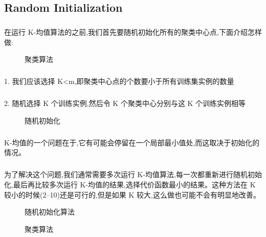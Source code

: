 \documentclass{article}
\begin{document}
\begin{CJK}{UTF8}{gbsn}
\subsection{Random Initialization}
\subparagraph{}
在运行 K-均值算法的之前,我们首先要随机初始化所有的聚类中心点,下面介绍怎样做:
\begin{figure}[H]
\label{fig:816}
\caption{聚类算法}
\end{figure}
\subparagraph{}
1. 我们应该选择 K<m,即聚类中心点的个数要小于所有训练集实例的数量
\subparagraph{}
2. 随机选择 K 个训练实例,然后令 K 个聚类中心分别与这 K 个训练实例相等
\begin{figure}[H]
\label{fig:817}
\caption{随机初始化}
\end{figure}
\subparagraph{}
K-均值的一个问题在于,它有可能会停留在一个局部最小值处,而这取决于初始化的情况。
\subparagraph{}
为了解决这个问题,我们通常需要多次运行 K-均值算法,每一次都重新进行随机初始化,最后再比较多次运行 K-均值的结果,选择代价函数最小的结果。这种方法在 K 较小的时候(2--10)还是可行的,但是如果 K 较大,这么做也可能不会有明显地改善。
\begin{figure}[H]
\label{fig:818}
\caption{随机初始化算法}
\end{figure}
\begin{figure}[H]
\label{fig:820}
\caption{聚类算法}
\end{figure}

\end{CJK}
\end{document}
